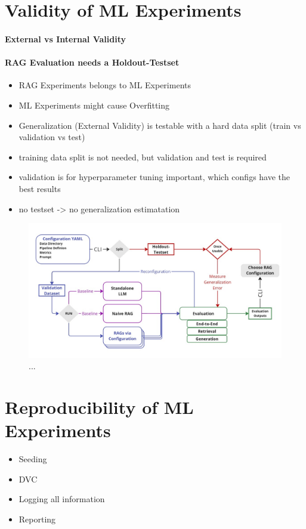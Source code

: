 \section{Validity of ML Experiments}

\paragraph{External vs Internal Validity}

\paragraph{RAG Evaluation needs a Holdout-Testset}
\begin{itemize}
    \item RAG Experiments belongs to ML Experiments
    \item ML Experiments might cause Overfitting
    \item Generalization (External Validity) is testable with a hard data split (train vs validation vs test)
    \item training data split is not needed, but validation and test is required
    \item validation is for hyperparameter tuning important, which configs have the best results
    \item no testset -> no generalization estimatation
\end{itemize}


\begin{figure}[!ht]
    \centering
    \includegraphics[width=\textwidth]{images/Sketch.pdf}
    \caption{...}
    \label{fig:EvaluationDesign}
\end{figure}


\section{Reproducibility of ML Experiments}
\begin{itemize}
    \item Seeding
    \item DVC 
    \item Logging all information
    \item Reporting
\end{itemize}


